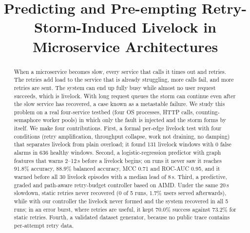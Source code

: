 \documentclass[conference,a4paper]{IEEEtran}
\begin{document}
\title{Predicting and Pre-empting Retry-Storm-Induced Livelock in Microservice Architectures}

\author{
\and
{}
}

\maketitle

\begin{abstract}
When a microservice becomes slow, every service that calls it times out and retries. The retries add load to the service that is already struggling, more calls fail, and more retries are sent. The system can end up fully busy while almost no user request succeeds, which is livelock. With long request queues the storm can continue even after the slow service has recovered, a case known as a metastable failure. We study this problem on a real four-service testbed (four OS processes, HTTP calls, counting-semaphore worker pools) in which only the fault is injected and the storm forms by itself. We make four contributions. First, a formal per-edge livelock test with four conditions (retry amplification, throughput collapse, work not draining, no damping) that separates livelock from plain overload; it found 131 livelock windows with 0 false alarms in 636 healthy windows. Second, a logistic-regression predictor with graph features that warns 2--12\,s before a livelock begins; on runs it never saw it reaches 91.8\% accuracy, 88.9\% balanced accuracy, MCC 0.71 and ROC-AUC 0.95, and it warned before all 30 livelock episodes with a median lead of 8\,s. Third, a predictive, graded and path-aware retry-budget controller based on AIMD. Under the same 20\,s slowdown, static retries never recovered (0 of 5 runs, 1.7\% users served afterwards), while with our controller the livelock never formed and the system recovered in all 5 runs; in an error burst, where retries are useful, it kept 70.0\% success against 73.2\% for static retries. Fourth, a validated dataset generator, because no public trace contains per-attempt retry data.
\end{abstract}
\end{document}
